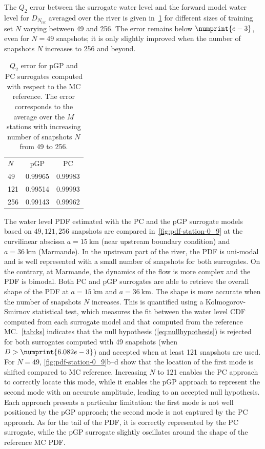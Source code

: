 
The $Q_2$ error between the surrogate water level and the forward model water level for $D_{N_{\text{ref}}}$ averaged over the river is given in~\cref{tab:valid_model} for different  sizes of training set $N$ varying between 49 and 256. The error remains below $\numprint{e-3}$, even for $N = 49$ snapshots; it is only slightly improved when the number of snapshots $N$ increases to 256 and beyond. 
\begin{table}[H]
\centering
\caption{$Q_2$ error for pGP and PC surrogates computed with respect to the MC reference. The error corresponds to the average over the $M$ stations with increasing number of snapshots $N$ from 49 to 256.}
\begin{tabular}{lcc}
\toprule
$N$ & pGP & PC \\
\cmidrule{2-3}
49  & 0.99965 & 0.99983\\
121 & 0.99514 & 0.99993\\
256 & 0.99143 & 0.99962\\
\bottomrule
\end{tabular}
\label{tab:valid_model}
\end{table}

The water level PDF estimated with the PC and the pGP surrogate models based on $49, 121, 256$ snapshots are compared in~\cref{fig:pdf-station-0_9} at the curvilinear abscissa $a = 15~\text{km}$ (near upstream boundary condition) and $a = 36~\text{km}$ (Marmande). In the upstream part of the river, the PDF is uni-modal and is well represented with a small number of snapshots for both surrogates. On the contrary, at Marmande, the dynamics of the flow is more complex and the PDF is bimodal. Both PC and pGP surrogates are able to retrieve the overall shape of the PDF at $a = 15~\text{km}$ and $a = 36~\text{km}$. The shape is more accurate when the number of snapshots $N$ increases. This is quantified using a Kolmogorov-Smirnov statistical test, which measures the fit between the water level CDF computed from each surrogate model and that computed from the reference MC.~\cref{tab:ks} indicates that the null hypothesis (\cref{eq:nullhypothesis}) is rejected for both surrogates computed with 49 snapshots (when $D > \numprint{6.082e-3}$) and accepted when at least 121 snapshots are used. For $N = 49$, \cref{fig:pdf-station-0_9}b--d show that the location of the first mode is shifted compared to MC reference. Increasing $N$ to 121 enables the PC approach to correctly locate this mode, while it enables the pGP approach to represent the second mode with an accurate amplitude, leading to an accepted null hypothesis. Each approach presents a particular limitation: the first mode is not well positioned by the pGP approach; the second mode is not captured by the PC approach. As for the tail of the PDF, it is correctly represented by the PC surrogate, while the pGP surrogate slightly oscillates around the shape of the reference MC PDF.


